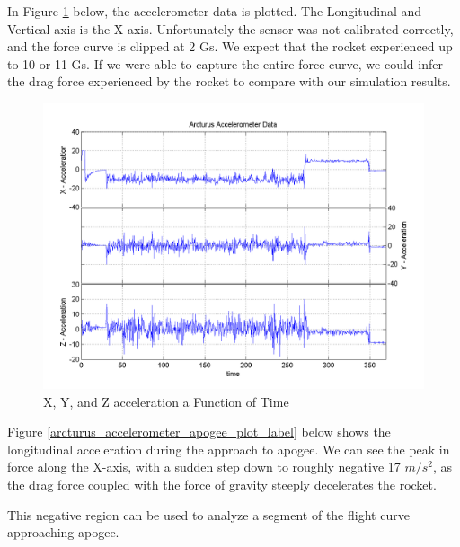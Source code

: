 \documentclass[]{article}
\begin{document}
In Figure \ref{arcturus_accelerometer_plot_label} below, the
accelerometer data is plotted. The Longitudinal and Vertical axis is the
X-axis. Unfortunately the sensor was not calibrated correctly, and the
force curve is clipped at 2 Gs. We expect that the rocket experienced up
to 10 or 11 Gs. If we were able to capture the entire force curve, we
could infer the drag force experienced by the rocket to compare with our
simulation results.

\begin{figure}[htbp]
\centering
\includegraphics{images/plots/arcturus_accelerometer_plot.png}
\caption{X, Y, and Z acceleration a Function of Time
\label{arcturus_accelerometer_plot_label}}
\end{figure}

Figure \ref{arcturus_accelerometer_apogee_plot_label} below shows the
longitudinal acceleration during the approach to apogee. We can see the
peak in force along the X-axis, with a sudden step down to roughly
negative 17 \(m/s^2\), as the drag force coupled with the force of
gravity steeply decelerates the rocket.

This negative region can be used to analyze a segment of the flight
curve approaching apogee.
\end{document}
